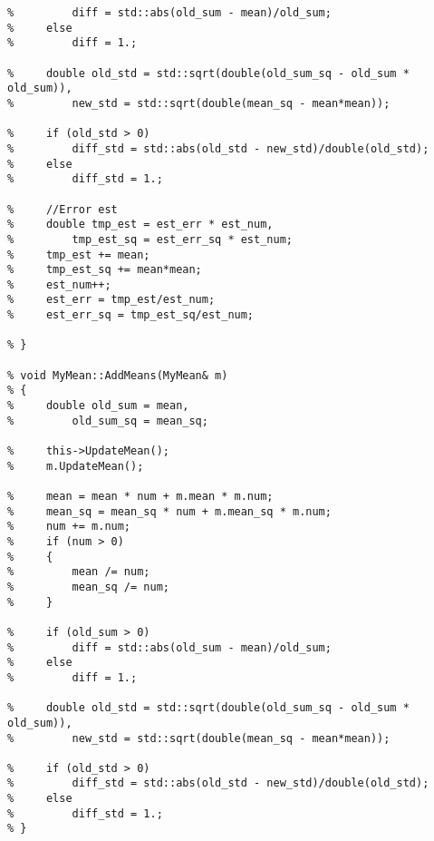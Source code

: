 \begin{lstlisting}[language={[ISO]C++}]
%     if (old_sum > 0)
%         diff = std::abs(old_sum - mean)/old_sum;
%     else
%         diff = 1.;
    
%     double old_std = std::sqrt(double(old_sum_sq - old_sum * old_sum)),
%         new_std = std::sqrt(double(mean_sq - mean*mean));

%     if (old_std > 0)
%         diff_std = std::abs(old_std - new_std)/double(old_std);
%     else
%         diff_std = 1.;

%     //Error est
%     double tmp_est = est_err * est_num,
%         tmp_est_sq = est_err_sq * est_num;
%     tmp_est += mean;
%     tmp_est_sq += mean*mean;
%     est_num++;
%     est_err = tmp_est/est_num;
%     est_err_sq = tmp_est_sq/est_num;

% }

% void MyMean::AddMeans(MyMean& m)
% {
%     double old_sum = mean,
%         old_sum_sq = mean_sq;
  
%     this->UpdateMean();
%     m.UpdateMean();
  
%     mean = mean * num + m.mean * m.num;
%     mean_sq = mean_sq * num + m.mean_sq * m.num;
%     num += m.num;
%     if (num > 0)
%     {
%         mean /= num;
%         mean_sq /= num;
%     }
  
%     if (old_sum > 0)
%         diff = std::abs(old_sum - mean)/old_sum;
%     else
%         diff = 1.;
  
%     double old_std = std::sqrt(double(old_sum_sq - old_sum * old_sum)),
%         new_std = std::sqrt(double(mean_sq - mean*mean));

%     if (old_std > 0)
%         diff_std = std::abs(old_std - new_std)/double(old_std);
%     else
%         diff_std = 1.;
% }
\end{lstlisting}


